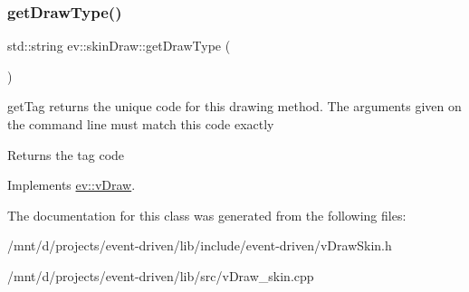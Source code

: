 \mbox{\label{classev_1_1skinDraw_a7015a083dffe5c055808c20b9372bce4}} 
\subsubsection{\texorpdfstring{get\+Draw\+Type()}{getDrawType()}}
{\footnotesize\ttfamily std\+::string ev\+::skin\+Draw\+::get\+Draw\+Type (\begin{DoxyParamCaption}{ }\end{DoxyParamCaption})\hspace{0.3cm}{\ttfamily [virtual]}}



get\+Tag returns the unique code for this drawing method. The arguments given on the command line must match this code exactly 

\begin{DoxyReturn}{Returns}
the tag code 
\end{DoxyReturn}


Implements \hyperlink{classev_1_1vDraw_ac01381befeffef2b930cbceb28b18a28}{ev\+::v\+Draw}.



The documentation for this class was generated from the following files\+:\begin{DoxyCompactItemize}
\item 
/mnt/d/projects/event-\/driven/lib/include/event-\/driven/v\+Draw\+Skin.\+h\item 
/mnt/d/projects/event-\/driven/lib/src/v\+Draw\+\_\+skin.\+cpp\end{DoxyCompactItemize}
